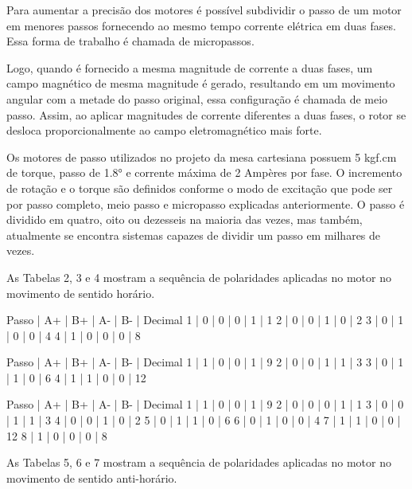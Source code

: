 Para aumentar a precisão dos motores é possível subdividir o passo de um motor em menores passos fornecendo 
ao mesmo tempo corrente elétrica em duas fases. Essa forma de trabalho é chamada de micropassos.

Logo, quando é fornecido a mesma magnitude de corrente a duas fases, um campo magnético de mesma magnitude é gerado, 
resultando em um movimento angular com a metade do passo original, essa configuração é chamada de  meio passo. 
Assim, ao aplicar magnitudes de corrente diferentes a duas fases, o rotor se desloca proporcionalmente ao campo 
eletromagnético mais forte.

Os motores de passo utilizados no projeto da mesa cartesiana possuem 5 kgf.cm de torque, passo de 1.8° e corrente 
máxima de 2 Ampères por fase. O incremento de rotação e o torque são definidos conforme o modo de excitação que 
pode ser por passo completo, meio passo e micropasso explicadas anteriormente. O passo é dividido em quatro, 
oito ou dezesseis na maioria das vezes, mas também, atualmente se encontra sistemas capazes de  dividir um passo 
em milhares de vezes.


As Tabelas 2, 3 e 4 mostram a sequência de polaridades aplicadas no motor no movimento de sentido horário.


Passo | A+ | B+ | A- | B- | Decimal
1 | 0 | 0 | 0 | 1 | 1
2 | 0 | 0 | 1 | 0 | 2
3 | 0 | 1 | 0 | 0 | 4
4 | 1 | 0 | 0 | 0 | 8


Passo | A+ | B+ | A- | B- | Decimal
1 | 1 | 0 | 0 | 1 | 9
2 | 0 | 0 | 1 | 1 | 3
3 | 0 | 1 | 1 | 0 | 6
4 | 1 | 1 | 0 | 0 | 12


Passo | A+ | B+ | A- | B- | Decimal
1 | 1 | 0 | 0 | 1 | 9
2 | 0 | 0 | 0 | 1 | 1
3 | 0 | 0 | 1 | 1 | 3
4 | 0 | 0 | 1 | 0 | 2
5 | 0 | 1 | 1 | 0 | 6
6 | 0 | 1 | 0 | 0 | 4
7 | 1 | 1 | 0 | 0 | 12
8 | 1 | 0 | 0 | 0 | 8

As Tabelas 5, 6 e 7 mostram a sequência de polaridades aplicadas no motor no movimento de sentido anti-horário.

